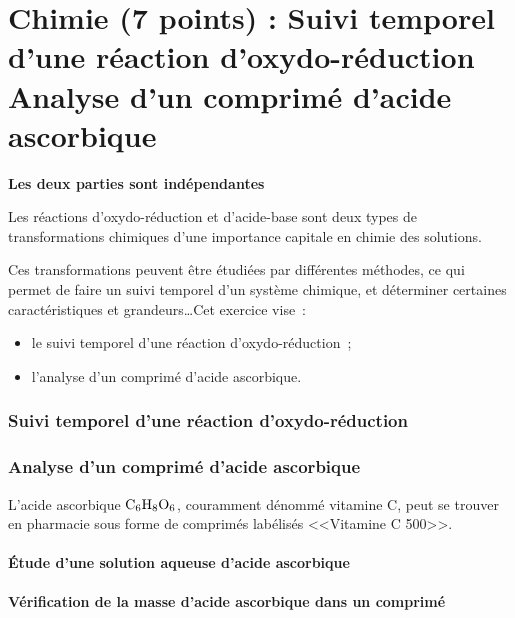 \part*{Chimie (7 points) : Suivi temporel d'une réaction d'oxydo-réduction \\
 Analyse d'un comprimé d'acide ascorbique}
\begin{center}
    \textbf{Les deux parties sont indépendantes}
\end{center}
Les réactions d'oxydo-réduction et d'acide-base sont deux types de
transformations chimiques d'une importance capitale en chimie des solutions.

Ces transformations peuvent être étudiées par différentes méthodes, ce qui
permet de faire un suivi temporel d'un système chimique, et déterminer certaines
caractéristiques et grandeurs\ldots Cet exercice vise~:
\begin{itemize}
    \item le suivi temporel d'une réaction d'oxydo-réduction~;
    \item l'analyse d'un comprimé d'acide ascorbique.
\end{itemize}

\section{Suivi temporel d'une réaction d'oxydo-réduction}


\section{Analyse d'un comprimé d'acide ascorbique}
L'acide ascorbique $\ce{C6H8O6}$, couramment dénommé vitamine C, peut se trouver
en pharmacie sous forme de comprimés labélisés <<Vitamine C 500>>.

\subsection{Étude d'une solution aqueuse d'acide ascorbique}


\subsection{Vérification de la masse d'acide ascorbique dans un comprimé}

